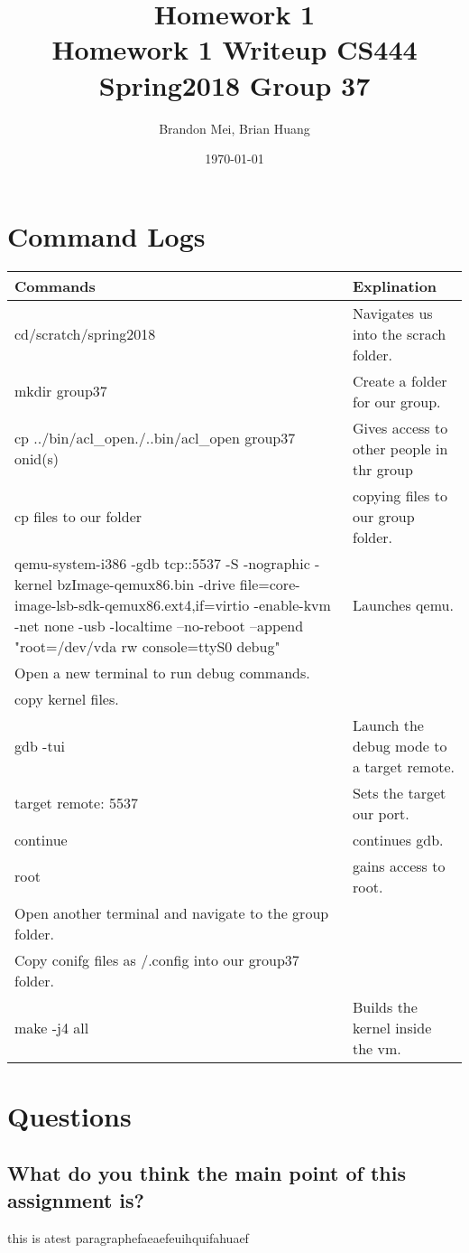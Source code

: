 \documentclass[onecolumn, draftclsnofoot, 10pt, titlepage, compsoc]{IEEEtran}
\title
{%
	Homework 1 \\
	\vspace{0.4cm}
	\large Homework 1 Writeup
	\vspace{0.4cm}
	\large CS444 Spring2018 Group 37
}
\author{Brandon Mei, Brian Huang}
\date{\today}
\begin{document}
\maketitle

\section*{Command Logs}
\begin{tabular}{ | p{5cm} | p{5cm} | }
		\hline
		\textbf{Commands} & \textbf{Explination} \\
		\hline
		\hline
		cd/scratch/spring2018 & Navigates us into the scrach folder. \\
		\hline
		mkdir group37 & Create a folder for our group. \\
		\hline
		cp ../bin/acl\_open./..bin/acl\_open group37 onid(s) & Gives access to other people in thr group \\
		\hline
		cp files to our folder & copying files to our group folder.\\
		\hline
		qemu-system-i386 -gdb tcp::5537 -S -nographic -kernel bzImage-qemux86.bin -drive file=core-image-lsb-sdk-qemux86.ext4,if=virtio -enable-kvm -net none -usb -localtime --no-reboot --append "root=/dev/vda rw console=ttyS0 debug" & Launches qemu.\\
		\hline
		Open a new terminal to run debug commands. & \\
		\hline
		copy kernel files. & \\
		\hline
		gdb -tui & Launch the debug mode to a target remote. \\
		\hline
		target remote: 5537 & Sets the target our port. \\
		\hline
		continue & continues gdb. \\
		\hline
		root & gains access to root. \\
		\hline
		Open another terminal and navigate to the group folder. & \\
		\hline
		Copy conifg files as /.config into our group37 folder. & \\
		\hline
		make -j4 all & Builds the kernel inside the vm. \\
		\hline
		
	\end{tabular} 

\section*{Questions}
\subsection*{What do you think the main point of this assignment is?}
this is atest paragraphefaeaefeuihquifahuaef
\end{document}
